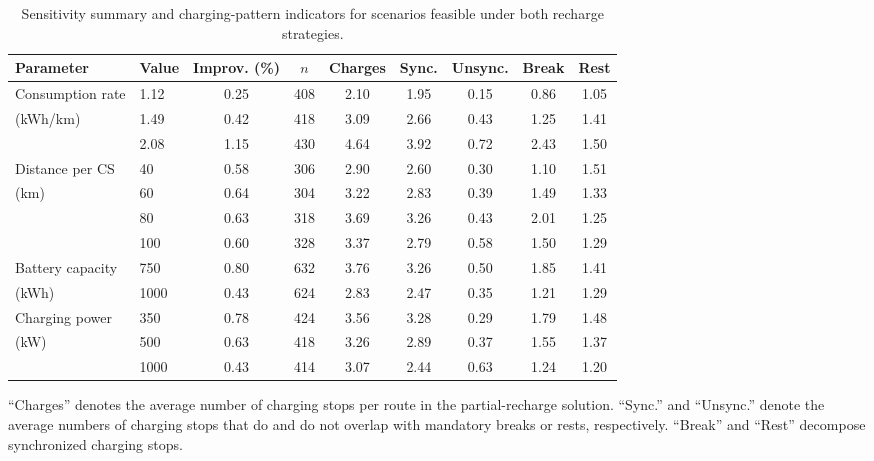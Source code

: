 \documentclass[3p,11pt,authoryear]{elsarticle}  %
\begin{document}
\begin{table}[t]
\centering
\caption{Sensitivity summary and charging-pattern indicators for scenarios feasible under both recharge strategies.}
\label{tab:sensitivity_mechanism}
\begin{threeparttable}
\small
\setlength{\tabcolsep}{3.5pt}
\renewcommand{\arraystretch}{1.1}
\begin{tabular}{
ll
S[table-format=1.2]
S[table-format=3.0]
S[table-format=1.2]
S[table-format=1.2]
S[table-format=1.2]
S[table-format=1.2]
S[table-format=1.2]
}
\toprule
Parameter & Value & {Improv. (\%)} & {$n$} & {Charges} & {Sync.} & {Unsync.} & {Break} & {Rest} \\
\midrule
Consumption rate & 1.12 & 0.25 & 408 & 2.10 & 1.95 & 0.15 & 0.86 & 1.05 \\
(kWh/km)         & 1.49 & 0.42 & 418 & 3.09 & 2.66 & 0.43 & 1.25 & 1.41 \\
                 & 2.08 & 1.15 & 430 & 4.64 & 3.92 & 0.72 & 2.43 & 1.50 \\
\addlinespace
Distance per CS & 40  & 0.58 & 306 & 2.90 & 2.60 & 0.30 & 1.10 & 1.51 \\
(km)            & 60  & 0.64 & 304 & 3.22 & 2.83 & 0.39 & 1.49 & 1.33 \\
                & 80  & 0.63 & 318 & 3.69 & 3.26 & 0.43 & 2.01 & 1.25 \\
                & 100 & 0.60 & 328 & 3.37 & 2.79 & 0.58 & 1.50 & 1.29 \\
\addlinespace
Battery capacity & 750  & 0.80 & 632 & 3.76 & 3.26 & 0.50 & 1.85 & 1.41 \\
(kWh)            & 1000 & 0.43 & 624 & 2.83 & 2.47 & 0.35 & 1.21 & 1.29 \\
\addlinespace
Charging power & 350  & 0.78 & 424 & 3.56 & 3.28 & 0.29 & 1.79 & 1.48 \\
(kW)           & 500  & 0.63 & 418 & 3.26 & 2.89 & 0.37 & 1.55 & 1.37 \\
               & 1000 & 0.43 & 414 & 3.07 & 2.44 & 0.63 & 1.24 & 1.20 \\
\bottomrule
\end{tabular}
\begin{tablenotes}[flushleft]
\footnotesize
\item ``Charges'' denotes the average number of charging stops per route in the partial-recharge solution. ``Sync.'' and ``Unsync.'' denote the average numbers of charging stops that do and do not overlap with mandatory breaks or rests, respectively. ``Break'' and ``Rest'' decompose synchronized charging stops.
\end{tablenotes}
\end{threeparttable}
\end{table}
\end{document}
